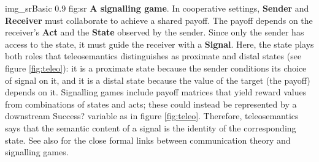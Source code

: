 \begin{myfig}
    {img_srBasic} %
    {0.9} %
    {fig:sr} %
    {\textbf{A signalling game}.
    In cooperative settings, \textbf{Sender} and \textbf{Receiver} must collaborate to achieve a shared payoff.
    The payoff depends on the receiver's \textbf{Act} and the \textbf{State} observed by the sender.
    Since only the sender has access to the state, it must guide the receiver with a \textbf{Signal}.
    Here, the state plays both roles that teleosemantics distinguishes as proximate and distal states (see figure \ref{fig:teleo}): it is a proximate state because the sender conditions its choice of signal on it, and it is a distal state because the value of the target (the payoff) depends on it.
    Signalling games include payoff matrices that yield reward values from combinations of states and acts; these could instead be represented by a downstream Success? variable as in figure \ref{fig:teleo}.
    Therefore, teleosemantics says that the semantic content of a signal is the identity of the corresponding state.
    See also \citet{martinez2019deception} for the close formal links between communication theory and signalling games.
    } %
\end{myfig}
